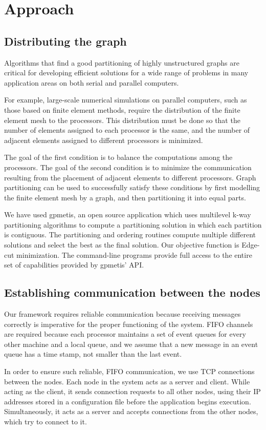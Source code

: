 \documentclass[12pt,a4paper]{article}
\begin{document}
\section{Approach}
	\subsection{Distributing the graph}
Algorithms that find a good partitioning of highly unstructured graphs are critical for developing efficient solutions for a wide range of problems in many application areas on both serial and parallel computers.

For example, large-scale numerical simulations on parallel computers, such as those based on finite element methods, require the distribution of the finite element mesh to the processors. This distribution must be done so that the number of elements assigned to each processor is the same, and the number of adjacent elements assigned to different processors is minimized.

The goal of the first condition is to balance the computations among the processors. The goal of the second condition is to minimize the communication resulting from the placement of adjacent elements to different processors. Graph partitioning can be used to successfully satisfy these conditions by first modelling the finite element mesh by a graph, and then partitioning it into equal parts.

We have used gpmetis, an open source application which uses multilevel k-way partitioning algorithms to compute a partitioning solution in which each partition is contiguous. The partitioning and ordering routines compute multiple different solutions and select the best as the final solution. Our objective function is Edge-cut minimization. The command-line programs provide full access to the entire set of capabilities provided by gpmetis' API.
	\subsection{Establishing communication between the nodes}
Our framework requires reliable communication because receiving messages correctly is imperative for the proper functioning of the system. FIFO channels are required because each processor maintains a set of event queues for every other machine and a local queue, and we assume that a new message in an event queue has a time stamp, not smaller than the last event.

In order to ensure such reliable, FIFO communication, we use TCP connections between the nodes. Each node in the system acts as a server and client. While acting as the client, it sends connection requests to all other nodes, using their IP addresses stored in a configuration file before the application begins execution. Simultaneously, it acts as a server and accepts connections from the other nodes, which try to connect to it.
\end{document}
